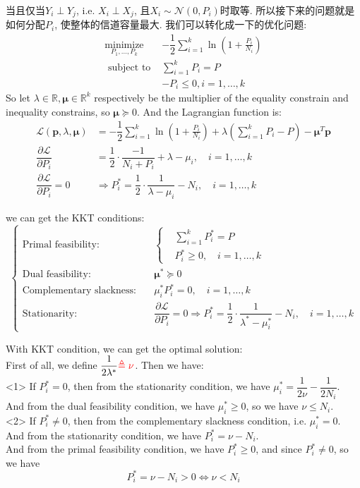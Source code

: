 当且仅当$Y_i\perp Y_j$, i.e. $X_i\perp X_j$, 且$X_i\sim\mathcal{N}(0,P_i)$时取等. 所以接下来的问题就是如何分配$P_i$, 使整体的信道容量最大. 我们可以转化成一下的优化问题:
$$
\begin{aligned}
\underset{P_1, \ldots, P_k}{\text{minimize}}\;\; & -\dfrac{1}{2}\sum_{i=1}^k \ln \left(1+\frac{P_i}{N_i}\right) \\
\text { subject to } & \sum_{i=1}^k P_i=P \\
& -P_i \leq 0, i=1, \ldots, k
\end{aligned}
$$
So let $\lambda\in\mathbb{R}, \pmb \mu\in\mathbb{R}^k$ respectively be the multiplier of the equality constrain and inequality constrains, so $\pmb \mu\succeq 0$. And the Lagrangian function is:
\begin{align*}
\mathcal{L}(\pmb p, \lambda, \pmb \mu) &= -\dfrac{1}{2}\sum_{i=1}^k \ln \left(1+\frac{P_i}{N_i}\right) + \lambda\left(\sum_{i=1}^k P_i-P\right) - \pmb \mu^T\pmb p \\
\dfrac{\partial \mathcal{L}}{\partial P_i} &= \dfrac{1}{2}\cdot\dfrac{-1}{N_i+ P_i} + \lambda - \mu_i, \quad i=1,\ldots,k \\
\dfrac{\partial \mathcal{L}}{\partial P_i} = 0 &\Rightarrow P_i^* = \dfrac{1}{2}\cdot\dfrac{1}{\lambda-\mu_i} - N_i, \quad i=1,\ldots,k
\end{align*}

we can get the KKT conditions:
$$\left\{
\begin{aligned}
\text{Primal feasibility:} &\quad
\left\{
\begin{aligned}
&\sum_{i=1}^k P_i^* = P \\
&P_i^* \geq 0, \quad i=1,\ldots,k
\end{aligned}
\right. \\
\text{Dual feasibility:} &\quad \pmb \mu^* \succeq 0 \\
\text{Complementary slackness:} &\quad \mu_i^* P_i^* = 0, \quad i=1,\ldots,k \\
\text{Stationarity:} &\quad \dfrac{\partial \mathcal{L}}{\partial P_i} = 0 \Rightarrow P_i^* = \dfrac{1}{2}\cdot\dfrac{1}{\lambda^*-\mu_i^*} - N_i, \quad i=1,\ldots,k
\end{aligned}
\right.$$

With KKT condition, we can get the optimal solution: \\
First of all, we define $\dfrac{1}{2\lambda^*} \textcolor{red}{\triangleq \nu}$. Then we have: \\
<1> If $P_i^*=0$, then from the stationarity condition, we have $\mu_i^* = \dfrac{1}{2\nu} - \dfrac{1}{2N_i}$. \\
And from the dual feasibility condition, we have $\mu_i^*\geq 0$, so we have $\nu\leq N_i$. \\
<2> If $P_i^*\neq 0$, then from the complementary slackness condition, i.e. $\mu_i^* = 0$. \\
And from the stationarity condition, we have $P_i^* = \nu - N_i$. \\
And from the primal feasibility condition, we have $P_i^* \geq 0$, and since $P_i^*\neq 0$, so we have
$$P_i^* = \nu - N_i > 0 \Leftrightarrow \nu < N_i$$

